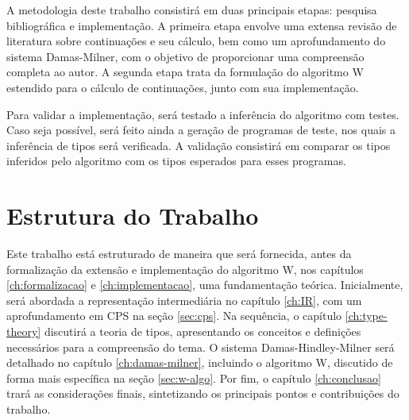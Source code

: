 A metodologia deste trabalho consistirá em duas principais etapas: pesquisa bibliográfica e implementação.
A primeira etapa envolve uma extensa revisão de literatura sobre continuações e seu cálculo, bem como um aprofundamento do sistema Damas-Milner, com o objetivo de proporcionar uma compreensão completa ao autor.
A segunda etapa trata da formulação do algoritmo W estendido para o cálculo de continuações, junto com sua implementação.

Para validar a implementação, será testado a inferência do algoritmo com testes.
Caso seja possível, será feito ainda a geração de programas de teste, nos quais a inferência de tipos será verificada.
A validação consistirá em comparar os tipos inferidos pelo algoritmo com os tipos esperados para esses programas.

\section{Estrutura do Trabalho}\label{sec:estrutura-trabalho}

Este trabalho está estruturado de maneira que será fornecida, antes da formalização da extensão e implementação do algoritmo W, nos capítulos \ref{ch:formalizacao} e \ref{ch:implementacao}, uma fundamentação teórica.
Inicialmente, será abordada a representação intermediária no capítulo \ref{ch:IR}, com um aprofundamento em CPS na seção \ref{sec:cps}.
Na sequência, o capítulo \ref{ch:type-theory} discutirá a teoria de tipos, apresentando os conceitos e definições necessários para a compreensão do tema.
O sistema Damas-Hindley-Milner será detalhado no capítulo \ref{ch:damas-milner}, incluindo o algoritmo W, discutido de forma mais específica na seção \ref{sec:w-algo}.
Por fim, o capítulo \ref{ch:conclusao} trará as considerações finais, sintetizando os principais pontos e contribuições do trabalho.

